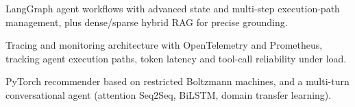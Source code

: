 \begin{cvitems}
  \item LangGraph agent workflows with advanced state and multi-step execution-path management, plus dense/sparse hybrid RAG for precise grounding.
\end{cvitems}

\begin{cvitems}
  \item Tracing and monitoring architecture with OpenTelemetry and Prometheus, tracking agent execution paths, token latency and tool-call reliability under load.
\end{cvitems}

\begin{cvitems}
  \item PyTorch recommender based on restricted Boltzmann machines, and a multi-turn conversational agent (attention Seq2Seq, BiLSTM, domain transfer learning).
\end{cvitems}


